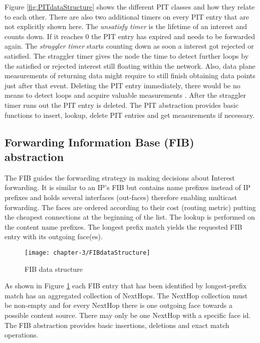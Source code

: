 Figure \ref{fig:PITdataStructure} shows the different PIT classes and how they relate to each other. There are also two additional timers on every PIT entry that are not explicitly shown here. The \emph{unsatisfy timer} is the lifetime of an interest and counts down. If it reaches 0 the PIT entry has expired and needs to be forwarded again. The \emph{straggler timer} starts counting down as soon a interest got rejected or satisfied. The straggler timer gives the node the time to detect further loops by the satisfied or rejected interest still floating within the network. Also, data plane measurements of returning data might require to still finish obtaining data points just after that event. Deleting the PIT entry immediately, there would be no means to detect loops and acquire valuable measurements \cite{Afanasyev16}. After the straggler timer runs out the PIT entry is deleted. The PIT abstraction provides basic functions to insert, lookup, delete PIT entries and get measurements if necessary.

\subsection{Forwarding Information Base (FIB) abstraction}

The FIB guides the forwarding strategy in making decisions about Interest forwarding. It is similar to an IP's FIB but contains name prefixes instead of IP prefixes and holds several interfaces (out-faces) therefore enabling multicast forwarding. The faces are ordered according to their cost (routing metric) putting the cheapest connections at the beginning of the list. The lookup is performed on the content name prefixes. The longest prefix match yields the requested FIB entry with its outgoing face(es).

\begin{figure}[H]
  \centering
  \texttt{[image: chapter-3/FIBdataStructure]}
  \caption{FIB data structure}
  \label{fig:FIBdataStructure}
\end{figure}

As shown in Figure \ref{fig:FIBdataStructure} each FIB entry that has been identified by longest-prefix match has an aggregated collection of NextHops. The NextHop collection must be non-empty and for every NextHop there is one outgoing face towards a possible content source. There may only be one NextHop with a specific face id. The FIB abstraction provides basic insertions, deletions and exact match operations.

